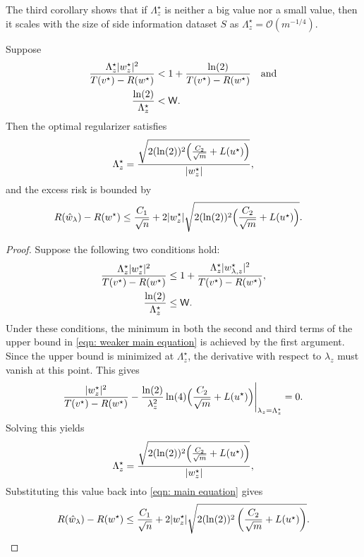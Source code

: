 The third corollary shows that if $\Lambda_z^\star$ is neither a big value nor a small value, then it scales with the size of side information dataset $S$  as $\Lambda_z^\star = \mathcal{O}(m^{-1/4})$.

\begin{corollary}\label{cor: consequence of main theorem 3}
Suppose
    \begin{equation*}
        \begin{aligned}
            \frac{\Lambda_z^\star|w^\star_z|^2}{T(v^\star) - R(w^\star)} &< 1+\frac{\ln(2)}{T(v^\star) - R(w^\star)} \quad \text{and} \\
            \frac{\ln(2)}{\Lambda_z^\star} &< \mathsf{W}.
        \end{aligned}
    \end{equation*}
Then the optimal regularizer satisfies
 \begin{equation*}
        \Lambda_z^\star = \frac{\sqrt{2(\ln(2))^2\Big(\frac{C_2}{\sqrt{m}} + L(u^\star)\Big)}}{|w^\star_z|},
    \end{equation*}
and the excess risk is bounded by
    \begin{equation*}
    \begin{aligned}
        R(\hat{w}_\lambda) - R(w^\star) &\leq \frac{C_1}{\sqrt{n}} + 2|w^\star_z|\sqrt{2(\ln(2))^2\Big(\frac{C_2}{\sqrt{m}} + L(u^\star)\Big)}.
    \end{aligned}
    \end{equation*}
\end{corollary}

\begin{proof}
Suppose the following two conditions hold:
\begin{equation*}
    \begin{aligned}
        \frac{\Lambda_z^\star |w^\star_z|^2}{T(v^\star) - R(w^\star)} &\leq 1 + \frac{\Lambda_z^\star |w^\star_{{\lambda,z}}|^2}{T(v^\star) - R(w^\star)}, \\
        \frac{\ln(2)}{\Lambda_z^\star} &\leq \mathsf{W}.
    \end{aligned}
\end{equation*}
Under these conditions, the minimum in both the second and third terms of the upper bound in \eqref{eqn: weaker main equation} is achieved by the first argument. Since the upper bound is minimized at $\Lambda_z^\star$, the derivative with respect to $\lambda_z$ must vanish at this point. This gives
\begin{equation*}
    \frac{|w^\star_z|^2}{T(v^\star) - R(w^\star)} - \frac{\ln(2)}{\lambda_z^2} \ln(4)\Big(\frac{C_2}{\sqrt{m}} + L(u^\star)\Big)\Bigg|_{\lambda_z = \Lambda_z^\star} = 0.
\end{equation*}
Solving this yields
\begin{equation*}
    \Lambda_z^\star = \frac{\sqrt{2(\ln(2))^2\Big(\frac{C_2}{\sqrt{m}} + L(u^\star)\Big)}}{|w^\star_z|},
\end{equation*}
Substituting this value back into \eqref{eqn: main equation} gives
\begin{equation*}
    R(\hat{w}_\lambda) - R(w^\star) \leq \frac{C_1}{\sqrt{n}} + 2|w^\star_z| \sqrt{ 2(\ln(2))^2 \left( \frac{C_2}{\sqrt{m}} + L(u^\star) \right) }.
\end{equation*}
\end{proof}

